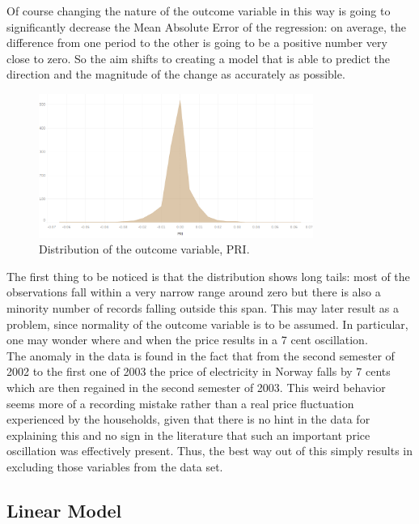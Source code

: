 \documentclass{book}
\begin{document}
Of course changing the nature of the outcome variable in this way is going to significantly decrease the Mean Absolute Error of the regression: on average, the difference from one period to the other is going to be a positive number very close to zero. So the aim shifts to creating a model that is able to predict the direction and the magnitude of the change as accurately as possible.

\bigskip
\begin{figure}[H]
\begin{center}
\captionsetup{justification=centering}
\includegraphics[width=0.8\textwidth]{Images/prihi.png}
\caption{Distribution of the outcome variable, PRI.}
\end{center}
\end{figure}
\bigskip

The first thing to be noticed is that the distribution shows long tails: most of the observations fall within a very narrow range around zero but there is also a minority number of records falling outside this span. This may later result as a problem, since normality of the outcome variable is to be assumed. In particular, one may wonder where and when the price results in a 7 cent oscillation.\\

The anomaly in the data is found in the fact that from the second semester of 2002 to the first one of 2003 the price of electricity in Norway falls by 7 cents which are then regained in the second semester of 2003. This weird behavior seems more of a recording mistake rather than a real price fluctuation experienced by the households, given that there is no hint in the data for explaining this and no sign in the literature that such an important price oscillation was effectively present. Thus, the best way out of this simply results in excluding those variables from the data set.

\subsection{Linear Model}
\end{document}
